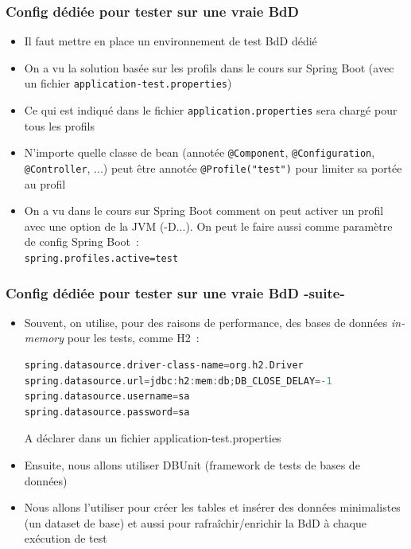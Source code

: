 \documentclass{beamer}
\begin{document}
\begin{frame}[fragile]
	\frametitle{Config dédiée pour tester sur une vraie BdD}
	\begin{itemize}
		\item Il faut mettre en place un environnement de test BdD dédié
		\item On a vu la solution basée sur les profils dans le cours sur Spring Boot (avec un fichier \texttt{application-test.properties})
		\item[] Ce qui est indiqué dans le fichier \texttt{application.properties} sera chargé pour tous les profils	
		\item N'importe quelle classe de bean (annotée \texttt{@Component}, \texttt{@Configuration}, \texttt{@Controller}, ...) peut être annotée \texttt{@Profile("test")} pour limiter sa portée au profil
		\item On a vu dans le cours sur Spring Boot comment on peut activer un profil avec une option de la JVM (-D...). On peut le faire aussi comme paramètre de config Spring Boot~:\\
		\texttt{spring.profiles.active=test}
	\end{itemize}

\end{frame}

\begin{frame}[fragile]
\frametitle{Config dédiée pour tester sur une vraie BdD -suite-}
\begin{itemize}
		\item Souvent, on utilise, pour des raisons de performance, des bases de données \textit{in-memory} pour les tests, comme H2~:
\begin{lstlisting}[language=C]
spring.datasource.driver-class-name=org.h2.Driver
spring.datasource.url=jdbc:h2:mem:db;DB_CLOSE_DELAY=-1
spring.datasource.username=sa
spring.datasource.password=sa
\end{lstlisting}
A déclarer dans un fichier application-test.properties
\item Ensuite, nous allons utiliser DBUnit (framework de tests de bases de données)
\item Nous allons l'utiliser pour créer les tables et insérer des données minimalistes (un dataset de base) et aussi pour rafraîchir/enrichir la BdD à chaque exécution de test 
	\end{itemize}
\end{frame}
\end{document}
